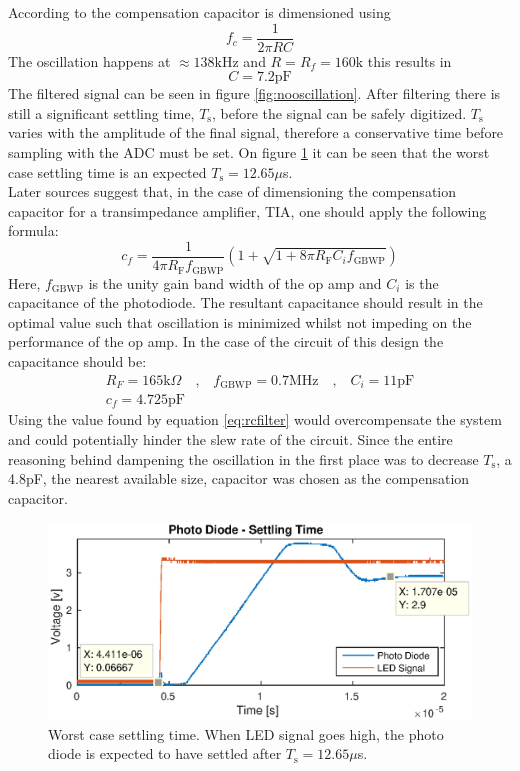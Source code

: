  According to \cite{mec} the compensation capacitor is dimensioned using
\begin{equation}
	\label{eq:rcfilter}
	f_c=\frac{1}{2\pi R C}
\end{equation}
The oscillation happens at $\approx 138\text{kHz}$ and $R = R_f = 160\text{k}$ this results in 
$$C = 7.2\text{pF}$$ 
The filtered signal can be seen in figure \ref{fig:nooscillation}. After filtering there is still a significant settling time, $T_{\text{s}}$, before the signal can be safely digitized. $T_{\text{s}}$ varies with the amplitude of the final signal, therefore a conservative time before sampling with the ADC must be set. 
On figure \ref{fig:settletime} it can be seen that the worst case settling time is an expected $T_{\text{s}}=12.65\mu$s.
\\
Later sources \cite{maxim} suggest that, in the case of dimensioning the compensation capacitor for a transimpedance amplifier, TIA, one should apply the following formula:
\begin{equation}
	c_f=\frac{1}{4\pi R_\text{F}f_\text{GBWP}}(1+\sqrt{1+8\pi R_\text{F}C_if_\text{GBWP}})
\end{equation}
Here, $f_\text{GBWP}$ is the unity gain band width of the op amp and $C_i$ is the capacitance of the photodiode. 
The resultant capacitance should result in the optimal value such that oscillation is minimized whilst not impeding on the performance of the op amp. In the case of the circuit of this design the capacitance should be:
\begin{gather}
	R_F = 165\text{k}\Omega \quad \text{,} \quad f_\text{GBWP}=0.7\text{MHz} \quad \text{,} \quad C_i=11\text{pF}\\
	c_f = 4.725 \text{pF}
\end{gather}
Using the value found by equation \ref{eq:rcfilter} would overcompensate the system and could potentially hinder the slew rate of the circuit. Since the entire reasoning behind dampening the oscillation in the first place was to decrease $T_\text{s}$, a 4.8pF, the nearest available size, capacitor was chosen as the compensation capacitor.  
\begin{figure}[h!]
	\includegraphics[width=\linewidth]{images/settle}
	\caption{Worst case settling time. When LED signal goes high, the photo diode is expected to have settled after $T_{\text{s}}=12.65\mu$s.}
	\label{fig:settletime}
\end{figure}